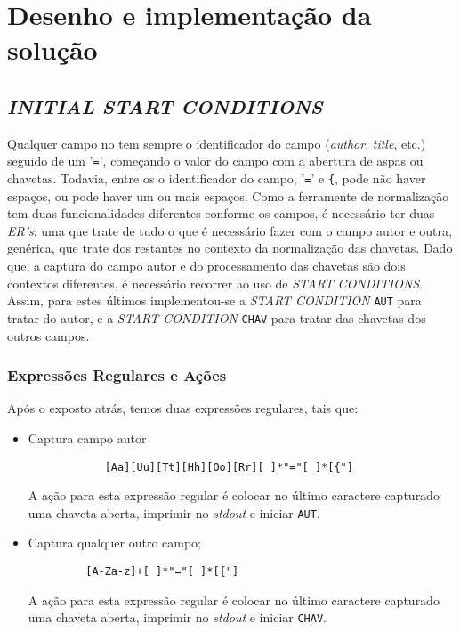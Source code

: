 \section{Desenho e implementação da solução}
\label{sec:des:b1}



\subsection{\emph{INITIAL \emph{START CONDITIONS}}}


Qualquer campo no  tem sempre o identificador do campo
(\emph{author}, \emph{title}, etc.) seguido de um '\texttt{=}', começando
o valor do campo com a abertura de aspas ou chavetas. Todavia, entre os
o identificador do campo, '\texttt{=}' e \texttt{\{}, pode não haver espaços, ou
pode haver um ou mais espaços. Como a ferramente de normalização tem duas
funcionalidades diferentes conforme os campos, é necessário ter duas
\emph{ER's}: uma que trate de tudo o que é necessário fazer com o campo autor
e outra, genérica, que trate dos restantes no contexto da normalização das
chavetas. Dado que, a captura do campo autor e do processamento das chavetas são
dois contextos diferentes, é necessário recorrer ao uso de \emph{START
CONDITIONS}. Assim, para estes últimos implementou-se a \emph{START 
CONDITION} \texttt{AUT} para tratar do autor, e a \emph{START
CONDITION} \texttt{CHAV} para tratar das chavetas dos outros campos.



\subsubsection{Expressões Regulares e Ações}
Após o exposto atrás, temos duas expressões regulares, tais que:

\begin{itemize}
	\item Captura campo autor
\begin{verbatim}
			[Aa][Uu][Tt][Hh][Oo][Rr][ ]*"="[ ]*[{"]
\end{verbatim}
A ação para esta expressão regular é colocar no último caractere capturado uma
chaveta aberta, imprimir no \emph{stdout} e iniciar \texttt{AUT}.
		

	\item Captura qualquer outro campo;
\begin{verbatim}
		 [A-Za-z]+[ ]*"="[ ]*[{"]
\end{verbatim}
A ação para esta expressão regular é colocar no último caractere capturado uma
chaveta aberta, imprimir no \emph{stdout} e iniciar \texttt{CHAV}.
\end{itemize}


